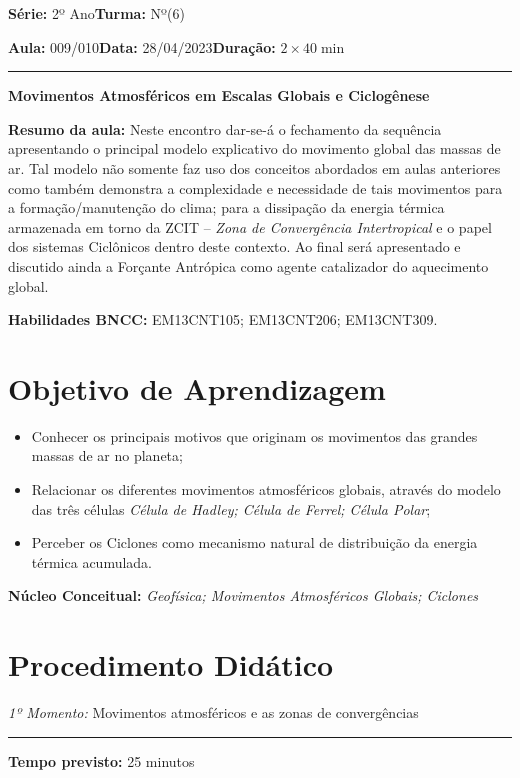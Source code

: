 \documentclass[
12pt,				%
openright,			%
oneside,			%
a4paper,			%
chapter=TITLE,		%
english,			%
brazil				%
]{abntex2}
\begin{document}
\par\noindent\textbf{Série:} 2º Ano\hfill{}\textbf{Turma:} Nº(6)
\par\noindent\textbf{Aula:} 009/010\hfill{}\textbf{Data:} 28/04/2023\hfill{}\textbf{Duração:} $2\times 40\min$
\rule{\textwidth}{.5pt}
\bigskip{}  
\noindent
\begin{center}
	\textbf{Movimentos Atmosféricos em Escalas Globais e Ciclogênese}
\end{center}
\par\noindent\textbf{Resumo da aula:} Neste encontro dar-se-á o fechamento da sequência apresentando o principal modelo explicativo do movimento global das massas de ar. Tal modelo não somente faz uso dos conceitos abordados em aulas anteriores como também demonstra a complexidade e necessidade de tais movimentos para a formação/manutenção do clima; para a dissipação da energia térmica armazenada em torno da ZCIT -- \textit{Zona de Convergência Intertropical} e o papel dos sistemas Ciclônicos dentro deste contexto. Ao final será apresentado e discutido ainda a Forçante Antrópica como agente catalizador do aquecimento global.
\par\noindent\textbf{Habilidades BNCC:} EM13CNT105; EM13CNT206; EM13CNT309.

\section{Objetivo de Aprendizagem}
\begin{itemize}
	\item Conhecer os principais motivos que originam os movimentos das grandes massas de ar no planeta; 
	\item Relacionar os diferentes movimentos atmosféricos globais, através do modelo das três células \textit{Célula de Hadley; Célula de Ferrel; Célula Polar};
	\item Perceber os Ciclones como mecanismo natural de distribuição da energia térmica acumulada.
\end{itemize}

\medskip{}

\noindent\textbf{Núcleo Conceitual:} \emph{Geofísica; Movimentos Atmosféricos Globais; Ciclones}
\newpage

\section{Procedimento Didático} 
\noindent\emph{1º Momento:} Movimentos atmosféricos e as zonas de convergências
\par\noindent\rule{.3\textwidth}{.5pt}  
\par\noindent\textbf{Tempo previsto:} 25 minutos
\end{document}
